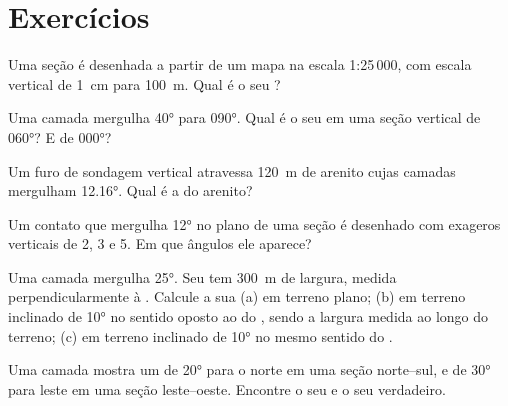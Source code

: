 \section{Exercícios}

\begin{exercise}[$\star$]\label{exo:b1:cross-sections:1}
Uma seção é desenhada a partir de um mapa na escala 1:25\,000, com escala vertical de \qty{1}{cm} para \qty{100}{m}. Qual é o seu ?
\end{exercise}

\begin{exercise}[$\star$]\label{exo:b1:cross-sections:2}
Uma camada mergulha \ang{40} para \ang{090}. Qual é o seu  em uma seção vertical de  \ang{060}? E de  \ang{000}?
\end{exercise}

\begin{exercise}[$\star$]\label{exo:b1:cross-sections:3}
Um furo de sondagem vertical atravessa \qty{120}{m} de arenito cujas camadas mergulham \ang{12.16}. Qual é a  do arenito?
\end{exercise}

\begin{exercise}[$\star$]\label{exo:b1:cross-sections:4}
Um contato que mergulha \ang{12} no plano de uma seção é desenhado com exageros verticais de 2, 3 e 5. Em que ângulos ele aparece?
\end{exercise}

\begin{exercise}[$\star\star$]\label{exo:b1:cross-sections:5}
Uma camada mergulha \ang{25}. Seu  tem \qty{300}{m} de largura, medida perpendicularmente à . Calcule a sua  (a) em terreno plano; (b) em terreno inclinado de \ang{10} no sentido oposto ao do , sendo a largura medida ao longo do terreno; (c) em terreno inclinado de \ang{10} no mesmo sentido do .
\end{exercise}

\begin{exercise}[$\star\star$]\label{exo:b1:cross-sections:6}
Uma camada mostra um  de \ang{20} para o norte em uma seção norte--sul, e de \ang{30} para leste em uma seção leste--oeste. Encontre o seu  e o seu  verdadeiro.
\end{exercise}

